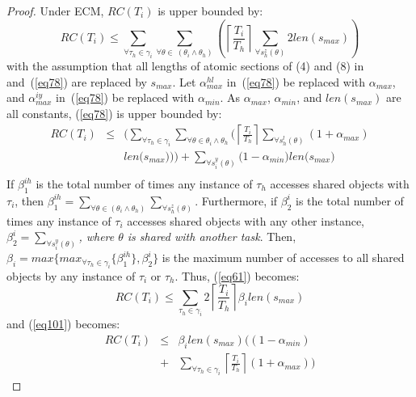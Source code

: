 \begin{proof}
Under ECM, $RC(T_{i})$ is upper bounded by:
\begin{equation}
RC(T_{i})\le\sum_{\forall \tau_{h}\in\gamma_{i}}\sum_{\forall \theta\in\ (\theta_{i}\wedge\theta_{h})}\left(\left\lceil\frac{T_{i}}{T_{h}}\right\rceil\sum_{\forall s_{h}^{z}(\theta)}2len(s_{max})\right)\label{eq61}\end{equation}
with the assumption that all lengths of atomic sections of (4) and (8) in~\cite{stmconcurrencycontrol:emsoft11} and~(\ref{eq78}) are replaced by $s_{max}$.
Let $\alpha_{max}^{hl}$ in~(\ref{eq78}) be replaced with $\alpha_{max}$, and $\alpha_{max}^{iy}$ in~(\ref{eq78}) be replaced with $\alpha_{min}$. 
As $\alpha_{max}$, $\alpha_{min}$, and $len(s_{max})$ are all constants, (\ref{eq78}) is upper bounded by:
\begin{eqnarray}
RC(T_i) & \le & \Bigg(\sum_{\forall \tau_h \in \gamma_i}\sum_{\forall\theta \in \theta_i \wedge \theta_h}\Bigg(\left\lceil\frac{T_{i}}{T_{h}}\right\rceil\sum_{\forall s_{h}^{l}(\theta)}\left(1+\alpha_{max}\right)\nonumber\\
& & len\Big(s_{max}\Big)\Bigg)\Bigg)
 +  \sum_{\forall s_{i}^{y}(\theta)}\Big(1-\alpha_{min}\Big)len\Big(s_{max}\Big)\nonumber\\ 
\label{eq101}\end{eqnarray}
%
If $\beta_1^{ih}$ is the total number of times any instance of $\tau_h$ accesses shared objects with $\tau_i$, then $\beta_1^{ih}=\sum_{\forall \theta\in(\theta_{i}\wedge\theta_{h})}\sum_{\forall s_{h}^{z}(\theta)}$. Furthermore, if $\beta_2^i$ is the total number of times any instance of $\tau_i$ accesses shared objects with any other instance,   $\beta_2^i=\sum_{\forall s_{i}^{y}(\theta)}$\textit{, where $\theta$ is shared with another task}. Then, $\beta_{i}=max\{max_{\forall \tau_h \in \gamma_i}\{\beta_1^{ih}\},\beta_2^i\}$ is the maximum number of accesses to all shared objects by any instance of $\tau_{i}$ or $\tau_{h}$. 
Thus, (\ref{eq61}) becomes:
\begin{equation}
RC(T_{i})\le\sum_{\tau_{h}\in\gamma_{i}}2\left\lceil\frac{T_{i}}{T_{h}}\right\rceil\beta_{i}len(s_{max})
\label{eq63}\end{equation}
and (\ref{eq101}) becomes:
\begin{eqnarray}
RC(T_{i}) & \le & \beta_{i}len(s_{max}) \Bigg((1-\alpha_{min})\nonumber\\
& + & \sum_{\forall \tau_h \in \gamma_i}\left\lceil\frac{T_{i}}{T_{h}}\right\rceil(1+\alpha_{max})\Bigg)
\label{eq102}\end{eqnarray}


\end{proof}
